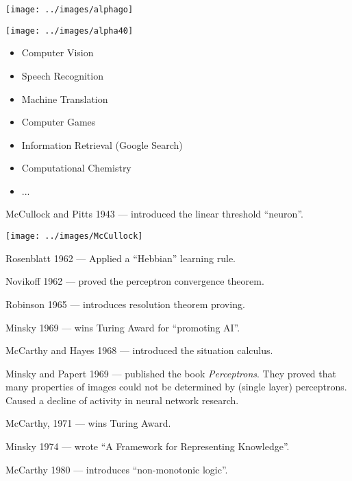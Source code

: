 {\slide{}

\centerline{\texttt{[image: ../images/alphago]}}



\vfill
\centerline{\texttt{[image: ../images/alpha40]}}


\begin{itemize}
\item Computer Vision
  \vfill
\item Speech Recognition
  \vfill
\item Machine Translation
  \vfill
\item Computer Games
  \vfill
\item Information Retrieval (Google Search)
  \vfill
\item Computational Chemistry
  \vfill
\item ...
\end{itemize}
  

McCullock and Pitts 1943 --- introduced the linear threshold ``neuron''.

\vfill
\centerline{\texttt{[image: ../images/McCullock]}}
\vfill

Rosenblatt 1962 --- Applied a ``Hebbian'' learning rule.

\vfill
Novikoff 1962 --- proved the perceptron convergence theorem.


Robinson 1965 --- introduces resolution theorem proving.

\vfill
Minsky 1969 --- wins Turing Award for ``promoting AI''.

\vfill
McCarthy and Hayes 1968 --- introduced the situation calculus.

\vfill
Minsky and Papert 1969 --- published the book {\it Perceptrons}.
They proved that many properties of images could not be determined by (single layer) perceptrons.
Caused a decline of activity in neural network research.

\vfill
McCarthy, 1971 --- wins Turing Award.

\vfill
Minsky 1974 --- wrote ``A Framework for Representing Knowledge''.

\vfill
McCarthy 1980 --- introduces ``non-monotonic logic''.


}
